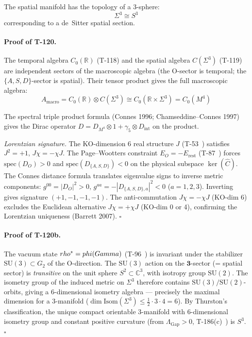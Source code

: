 \begin{theorembox}
The spatial manifold has the topology of a 3-sphere:
\begin{equation}
  \Sigma^3 \cong S^3
  \label{eq:vacuum-topology}
\end{equation}
corresponding to a de~Sitter spatial section.
\end{theorembox}

\paragraph{Proof of T-120.}
The temporal algebra $C_0(\mathbb{R})$ (T-118) and the spatial algebra $C(\Sigma^3)$
(T-119) are independent sectors of the macroscopic algebra (the O-sector is temporal;
the $\{A,S,D\}$-sector is spatial). Their tensor product gives the full macroscopic
algebra:
\begin{equation}
  A_{\mathrm{macro}} = C_0(\mathbb{R}) \otimes C(\Sigma^3)
  \cong C_0(\mathbb{R} \times \Sigma^3) = C_0(M^4)
\end{equation}

The spectral triple product formula (Connes 1996; Chamseddine--Connes 1997) gives the Dirac operator $D = D_{M^4} \otimes 1 + \gamma_5 \otimes D_{\mathrm{int}}$ on the product.

\emph{Lorentzian signature.} The KO-dimension 6 real structure $J$ (T-53~) satisfies $J^2 = +1$, $J\chi = -\chi J$. The Page--Wootters constraint $E_O = -E_{\mathrm{rest}}$ (T-87~) forces $\mathrm{spec}(D_O) > 0$ and $\mathrm{spec}(D_{\{A,S,D\}}) < 0$ on the physical subspace $\ker(\hat{C})$. The Connes distance formula translates eigenvalue signs to inverse metric components: $g^{00} = |D_O|^2 > 0$, $g^{aa} = -|D_{\{A,S,D\},a}|^2 < 0$ ($a = 1,2,3$). Inverting gives signature $(+1,-1,-1,-1)$. The anti-commutation $J\chi = -\chi J$ (KO-dim 6) excludes the Euclidean alternative $J\chi = +\chi J$ (KO-dim 0 or 4), confirming the Lorentzian uniqueness (Barrett 2007). $\square$

\paragraph{Proof of T-120b.}
The vacuum state $rho^* = phi(Gamma)$ (T-96~) is invariant under
the stabilizer $\mathrm{SU}(3) \subset G_2$ of the O-direction. The
$\mathrm{SU}(3)$ action on the $\mathbf{3}$-sector (= spatial sector) is
\emph{transitive} on the unit sphere $S^2 \subset \mathbb{C}^3$, with isotropy
group $\mathrm{SU}(2)$. The isometry group of the induced metric on $\Sigma^3$
therefore contains $\mathrm{SU}(3)/\mathrm{SU}(2)$-orbits, giving a
6-dimensional isometry algebra --- precisely the maximal dimension for a
3-manifold ($\dim\mathrm{Isom}(\Sigma^3) \leq \tfrac{1}{2} \cdot 3 \cdot 4 = 6$).
By Thurston's classification, the unique compact orientable 3-manifold with
6-dimensional isometry group and constant positive curvature (from
$\Lambda_{\mathrm{Gap}} > 0$, T-186(c)~) is $S^3$. $\square$

